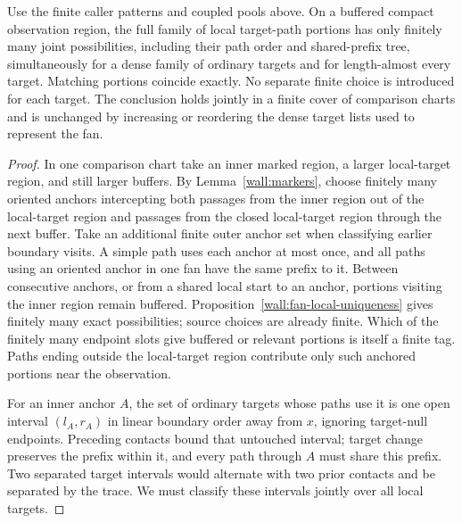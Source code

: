 \begin{proposition}\label{wall:simultaneous-targets}
Use the finite caller patterns and coupled pools above.  On a buffered compact observation region, the full family of local target-path portions has only finitely many joint possibilities, including their path order and shared-prefix tree, simultaneously for a dense family of ordinary targets and for length-almost every target.  Matching portions coincide exactly.  No separate finite choice is introduced for each target.  The conclusion holds jointly in a finite cover of comparison charts and is unchanged by increasing or reordering the dense target lists used to represent the fan.
\end{proposition}

\begin{proof}
In one comparison chart take an inner marked region, a larger local-target region, and still larger buffers.  By Lemma~\ref{wall:markers}, choose finitely many oriented anchors intercepting both passages from the inner region out of the local-target region and passages from the closed local-target region through the next buffer.  Take an additional finite outer anchor set when classifying earlier boundary visits.  A simple path uses each anchor at most once, and all paths using an oriented anchor in one fan have the same prefix to it.  Between consecutive anchors, or from a shared local start to an anchor, portions visiting the inner region remain buffered.  Proposition~\ref{wall:fan-local-uniqueness} gives finitely many exact possibilities; source choices are already finite.  Which of the finitely many endpoint slots give buffered or relevant portions is itself a finite tag.  Paths ending outside the local-target region contribute only such anchored portions near the observation.

For an inner anchor $A$, the set of ordinary targets whose paths use it is one open interval $(l_A,r_A)$ in linear boundary order away from $x$, ignoring target-null endpoints.  Preceding contacts bound that untouched interval; target change preserves the prefix within it, and every path through $A$ must share this prefix.  Two separated target intervals would alternate with two prior contacts and be separated by the trace.  We must classify these intervals jointly over all local targets.


\end{proof}
